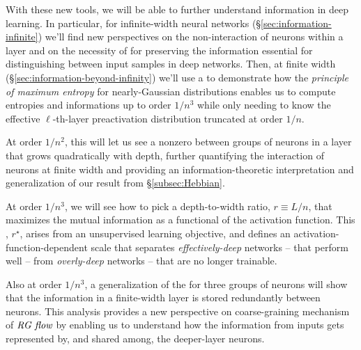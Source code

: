 With these new tools, we will be able to further 
understand information in deep learning. In particular, for infinite-width neural networks (\S\ref{sec:information-infinite}) we'll find new perspectives on the non-interaction of neurons within a layer and on the necessity of  for 
preserving the information essential for distinguishing between input samples in deep networks.
Then, at finite width (\S\ref{sec:information-beyond-infinity}) we'll use a  to demonstrate how the \emph{principle of maximum entropy} for nearly-Gaussian distributions enables us to 
compute entropies and informations up to order $1/n^3$ while only needing to know the effective $\ell$-th-layer preactivation distribution 
truncated at order $1/n$. 

At order $1/n^2$, this will let us see a nonzero  between groups of neurons in a layer that grows quadratically with depth, further quantifying the interaction of neurons at finite width and providing an information-theoretic interpretation and generalization of our  result from \S\ref{subsec:Hebbian}. 

At order $1/n^3$, we will see how to pick a depth-to-width ratio, $r\equiv L/n$, that maximizes the mutual information as a functional of
the activation function. This , $r^\star$, arises from an unsupervised learning objective, and defines an activation-function-dependent scale that separates \emph{effectively-deep} networks -- that perform well -- from \emph{overly-deep} networks -- that are no longer trainable. 

Also at order $1/n^3$, a generalization of the  for three groups of neurons will show that the information in a finite-width layer is stored redundantly between neurons. 
This analysis 
provides a new perspective on coarse-graining mechanism of $\emph{RG flow}$
by enabling us to understand how the information from inputs gets represented by, and shared among, the deeper-layer neurons.

